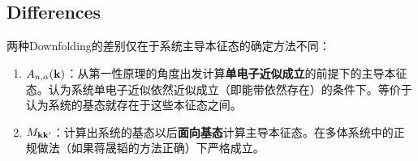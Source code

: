 \documentclass{article}
\begin{document}
	\subsection{Differences}
	两种Downfolding的差别仅在于系统主导本征态的确定方法不同：
	\begin{enumerate}
		\item $A_{n,\alpha}(\vb{k})$：从第一性原理的角度出发计算\textbf{单电子近似成立}的前提下的主导本征态。认为系统单电子近似依然近似成立（即能带依然存在）的条件下。等价于认为系统的基态就存在于这些本征态之间。
		\item $M_{\vb{k}\vb{k}'}$：计算出系统的基态以后\textbf{面向基态}计算主导本征态。在多体系统中的正规做法（如果蒋晟韬的方法正确）下严格成立。
	\end{enumerate}
	
\end{document}
